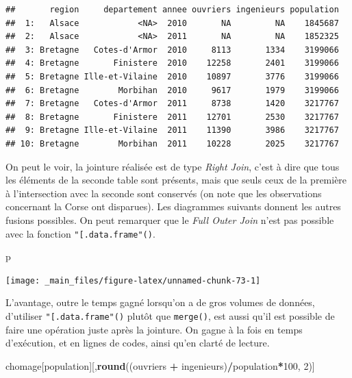 \documentclass[
  11pt,
]{book}
\newenvironment{Shaded}{\begin{snugshade}}{\end{snugshade}}
\newcommand{\DecValTok}[1]{\textcolor[rgb]{0.00,0.00,0.81}{#1}}
\newcommand{\KeywordTok}[1]{\textcolor[rgb]{0.13,0.29,0.53}{\textbf{#1}}}
\newcommand{\NormalTok}[1]{#1}
\newcommand{\OperatorTok}[1]{\textcolor[rgb]{0.81,0.36,0.00}{\textbf{#1}}}
\newcommand{\StringTok}[1]{\textcolor[rgb]{0.31,0.60,0.02}{#1}}
\numberwithin{equation}{section}
\numberwithin{countremarque}{section}
\begin{document}
\begin{lstlisting}
##       region     departement annee ouvriers ingenieurs population
##  1:   Alsace            <NA>  2010       NA         NA    1845687
##  2:   Alsace            <NA>  2011       NA         NA    1852325
##  3: Bretagne   Cotes-d'Armor  2010     8113       1334    3199066
##  4: Bretagne       Finistere  2010    12258       2401    3199066
##  5: Bretagne Ille-et-Vilaine  2010    10897       3776    3199066
##  6: Bretagne        Morbihan  2010     9617       1979    3199066
##  7: Bretagne   Cotes-d'Armor  2011     8738       1420    3217767
##  8: Bretagne       Finistere  2011    12701       2530    3217767
##  9: Bretagne Ille-et-Vilaine  2011    11390       3986    3217767
## 10: Bretagne        Morbihan  2011    10228       2025    3217767
\end{lstlisting}

On peut le voir, la jointure réalisée est de type \emph{Right Join}, c'est à dire que tous les éléments de la seconde table sont présents, mais que seuls ceux de la première à l'intersection avec la seconde sont conservés (on note que les observations concernant la Corse ont disparues). Les diagrammes suivants donnent les autres fusions possibles. On peut remarquer que le \emph{Full Outer Join} n'est pas possible avec la fonction \texttt{"{[}.data.frame"()}.

\begin{Shaded}
\begin{Highlighting}[]
\NormalTok{p}
\end{Highlighting}
\end{Shaded}

\begin{center}\texttt{[image: \_main\_files/figure-latex/unnamed-chunk-73-1]} \end{center}

L'avantage, outre le temps gagné lorsqu'on a de gros volumes de données, d'utiliser \texttt{"{[}.data.frame"()} plutôt que \texttt{merge()}, est aussi qu'il est possible de faire une opération juste après la jointure. On gagne à la fois en temps d'exécution, et en lignes de codes, ainsi qu'en clarté de lecture.

\begin{Shaded}
\begin{Highlighting}[]
\NormalTok{chomage[population][,}\KeywordTok{round}\NormalTok{((ouvriers }\OperatorTok{+}\StringTok{ }\NormalTok{ingenieurs)}\OperatorTok{/}\NormalTok{population}\OperatorTok{*}\DecValTok{100}\NormalTok{, }\DecValTok{2}\NormalTok{)]}
\end{Highlighting}
\end{Shaded}
\end{document}
